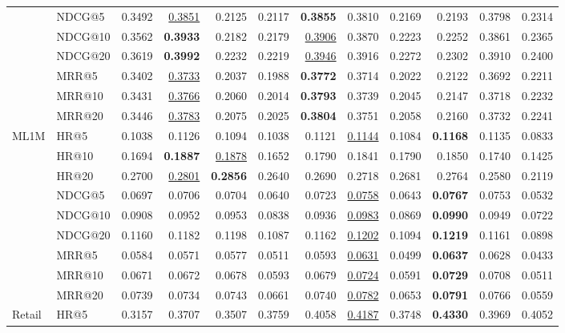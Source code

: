 \begin{tabular}{llrrrrrrrrrr}
 & NDCG@5 & 0.3492 & \underline{0.3851} & 0.2125 & 0.2117 & \textbf{0.3855} & 0.3810 & 0.2169 & 0.2193 & 0.3798 & 0.2314 \\
 & NDCG@10 & 0.3562 & \textbf{0.3933} & 0.2182 & 0.2179 & \underline{0.3906} & 0.3870 & 0.2223 & 0.2252 & 0.3861 & 0.2365 \\
 & NDCG@20 & 0.3619 & \textbf{0.3992} & 0.2232 & 0.2219 & \underline{0.3946} & 0.3916 & 0.2272 & 0.2302 & 0.3910 & 0.2400 \\
 & MRR@5 & 0.3402 & \underline{0.3733} & 0.2037 & 0.1988 & \textbf{0.3772} & 0.3714 & 0.2022 & 0.2122 & 0.3692 & 0.2211 \\
 & MRR@10 & 0.3431 & \underline{0.3766} & 0.2060 & 0.2014 & \textbf{0.3793} & 0.3739 & 0.2045 & 0.2147 & 0.3718 & 0.2232 \\
 & MRR@20 & 0.3446 & \underline{0.3783} & 0.2075 & 0.2025 & \textbf{0.3804} & 0.3751 & 0.2058 & 0.2160 & 0.3732 & 0.2241 \\
\hline
ML1M & HR@5 & 0.1038 & 0.1126 & 0.1094 & 0.1038 & 0.1121 & \underline{0.1144} & 0.1084 & \textbf{0.1168} & 0.1135 & 0.0833 \\
 & HR@10 & 0.1694 & \textbf{0.1887} & \underline{0.1878} & 0.1652 & 0.1790 & 0.1841 & 0.1790 & 0.1850 & 0.1740 & 0.1425 \\
 & HR@20 & 0.2700 & \underline{0.2801} & \textbf{0.2856} & 0.2640 & 0.2690 & 0.2718 & 0.2681 & 0.2764 & 0.2580 & 0.2119 \\
 & NDCG@5 & 0.0697 & 0.0706 & 0.0704 & 0.0640 & 0.0723 & \underline{0.0758} & 0.0643 & \textbf{0.0767} & 0.0753 & 0.0532 \\
 & NDCG@10 & 0.0908 & 0.0952 & 0.0953 & 0.0838 & 0.0936 & \underline{0.0983} & 0.0869 & \textbf{0.0990} & 0.0949 & 0.0722 \\
 & NDCG@20 & 0.1160 & 0.1182 & 0.1198 & 0.1087 & 0.1162 & \underline{0.1202} & 0.1094 & \textbf{0.1219} & 0.1161 & 0.0898 \\
 & MRR@5 & 0.0584 & 0.0571 & 0.0577 & 0.0511 & 0.0593 & \underline{0.0631} & 0.0499 & \textbf{0.0637} & 0.0628 & 0.0433 \\
 & MRR@10 & 0.0671 & 0.0672 & 0.0678 & 0.0593 & 0.0679 & \underline{0.0724} & 0.0591 & \textbf{0.0729} & 0.0708 & 0.0511 \\
 & MRR@20 & 0.0739 & 0.0734 & 0.0743 & 0.0661 & 0.0740 & \underline{0.0782} & 0.0653 & \textbf{0.0791} & 0.0766 & 0.0559 \\
\hline
Retail & HR@5 & 0.3157 & 0.3707 & 0.3507 & 0.3759 & 0.4058 & \underline{0.4187} & 0.3748 & \textbf{0.4330} & 0.3969 & 0.4052 \\

\end{tabular}
